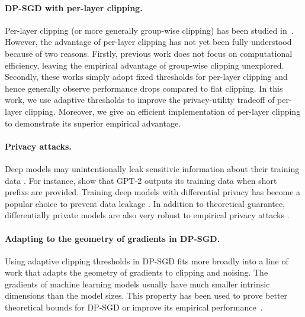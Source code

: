 \paragraph{DP-SGD with per-layer clipping.} Per-layer clipping (or more generally group-wise clipping)  has been studied in~\cite{abadi2016deep,mcmahan2018general, mcmahan2018learning, dupuy2022efficient}. However, the advantage of per-layer clipping has not yet been fully understood because of two reasons. Firstly, previous work does not focus on computational efficiency, leaving the empirical advantage of group-wise clipping unexplored. Secondly, these works simply adopt fixed thresholds for per-layer clipping and hence generally observe performance drops compared to flat clipping. In this work, we use adaptive thresholds to improve the privacy-utility tradeoff of per-layer clipping. Moreover, we give an efficient implementation of per-layer clipping to demonstrate its superior empirical advantage. 

\paragraph{Privacy attacks.} Deep models may unintentionally leak sensitivie information about their training data \citep{shokri2017membership,hitaj2017deep,zhu2019deep,song2019privacy,carlini2020extracting,choquette2021label,carlini2022membership,balle2022reconstructing}. For instance, \cite{carlini2020extracting} show that GPT-2 outputs its training data when short prefixs are provided. Training deep models with differential privacy has become a popular choice  to prevent data leakage \citep{abadi2016deep,papernot2016semi,mcmahan2018learning,zhu2020private}. In addition to theoretical guarantee, differentially private models are also very robust to empirical privacy attacks \citep{bernau2019assessing,carlini2019secret,yu2021large}. 

\paragraph{Adapting to the geometry of gradients in DP-SGD.} Using adaptive clipping thresholds in DP-SGD fits more broadly into a line of work that adapts the geometry of gradients to clipping and noising. The gradients of machine learning models usually have much smaller intrinsic dimensions than the model sizes. This property has been used to prove better theoretical bounds for DP-SGD or improve its empirical performance~\citep{kairouz2020fast,song2020characterizing,zhou2021bypassing,yu2021do,li2022does,ma2022dimension}.
